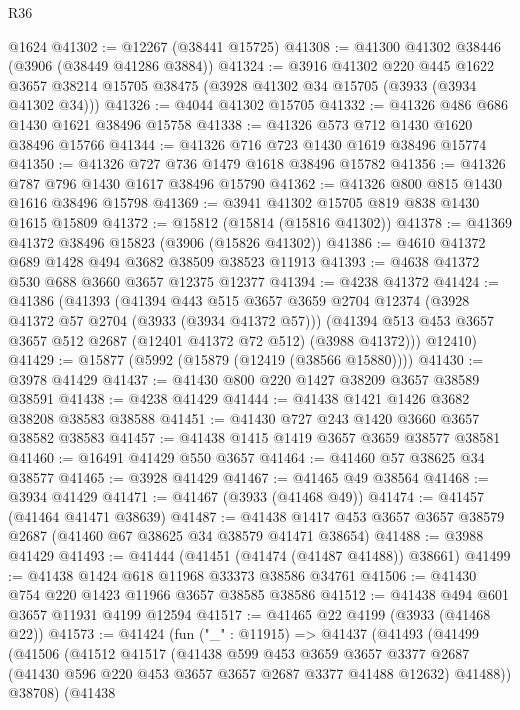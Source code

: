 \begin{lexlean}{R36}
\begin{coremodule}
    @1624
@41302 := @12267 (@38441 @15725)
@41308 := @41300 @41302 @38446 (@3906 (@38449 @41286 @3884))
@41324 := @3916
    @41302
    @220
    @445
    @1622
    @3657
    @38214
    @15705
    @38475
    (@3928 @41302 @34 @15705 (@3933 (@3934 @41302 @34)))
@41326 := @4044 @41302 @15705
@41332 := @41326 @486 @686 @1430 @1621 @38496 @15758
@41338 := @41326 @573 @712 @1430 @1620 @38496 @15766
@41344 := @41326 @716 @723 @1430 @1619 @38496 @15774
@41350 := @41326 @727 @736 @1479 @1618 @38496 @15782
@41356 := @41326 @787 @796 @1430 @1617 @38496 @15790
@41362 := @41326 @800 @815 @1430 @1616 @38496 @15798
@41369 := @3941 @41302 @15705 @819 @838 @1430 @1615 @15809
@41372 := @15812 (@15814 (@15816 @41302))
@41378 := @41369 @41372 @38496 @15823 (@3906 (@15826 @41302))
@41386 := @4610 @41372 @689 @1428 @494 @3682 @38509 @38523 @11913
@41393 := @4638 @41372 @530 @688 @3660 @3657 @12375 @12377
@41394 := @4238 @41372
@41424 := @41386
    (@41393
      (@41394
        @443
        @515
        @3657
        @3659
        @2704
        @12374
        (@3928 @41372 @57 @2704 (@3933 (@3934 @41372 @57)))
        (@41394 @513 @453 @3657 @3657 @512 @2687 (@12401 @41372 @72 @512) (@3988 @41372)))
      @12410)
@41429 := @15877 (@5992 (@15879 (@12419 (@38566 @15880))))
@41430 := @3978 @41429
@41437 := @41430 @800 @220 @1427 @38209 @3657 @38589 @38591
@41438 := @4238 @41429
@41444 := @41438 @1421 @1426 @3682 @38208 @38583 @38588
@41451 := @41430 @727 @243 @1420 @3660 @3657 @38582 @38583
@41457 := @41438 @1415 @1419 @3657 @3659 @38577 @38581
@41460 := @16491 @41429 @550 @3657
@41464 := @41460 @57 @38625 @34 @38577
@41465 := @3928 @41429
@41467 := @41465 @49 @38564
@41468 := @3934 @41429
@41471 := @41467 (@3933 (@41468 @49))
@41474 := @41457 (@41464 @41471 @38639)
@41487 := @41438 @1417 @453 @3657 @3657 @38579 @2687 (@41460 @67 @38625 @34 @38579 @41471 @38654)
@41488 := @3988 @41429
@41493 := @41444 (@41451 (@41474 (@41487 @41488)) @38661)
@41499 := @41438 @1424 @618 @11968 @33373 @38586 @34761
@41506 := @41430 @754 @220 @1423 @11966 @3657 @38585 @38586
@41512 := @41438 @494 @601 @3657 @11931 @4199 @12594
@41517 := @41465 @22 @4199 (@3933 (@41468 @22))
@41573 := @41424
    (fun ("_" : @11915) =>
    @41437
      (@41493
        (@41499
          (@41506
            (@41512
              @41517
              (@41438
                @599
                @453
                @3659
                @3657
                @3377
                @2687
                (@41430 @596 @220 @453 @3657 @3657 @2687 @3377 @41488 @12632)
                @41488))
            @38708)
          (@41438

\end{coremodule}
\end{lexlean}

